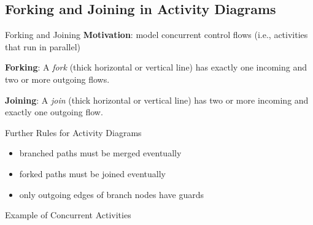 \subsection{Forking and Joining in Activity Diagrams}
\begin{frame}{\insertsubsection}
	\begin{fancycolumns}[animation=none]
		\nextcolumn
		\begin{definition}{{Forking and Joining \mysource{\umluserguide}}}
			\textbf{Motivation}: model concurrent control flows (i.e., activities that run in parallel)
			
			\textbf{Forking}: A \emph{fork} (thick horizontal or vertical line) has exactly one incoming and two or more outgoing flows. 
			
			\textbf{Joining}: A \emph{join} (thick horizontal or vertical line) has two or more incoming and exactly one outgoing flow. 
		\end{definition}
		\pause
		\begin{note}{Further Rules for Activity Diagrams}
			\begin{itemize}
				\item branched paths must be merged eventually 
				\item forked paths must be joined eventually
				\item only outgoing edges of branch nodes have guards
			\end{itemize}
		\end{note}
	\end{fancycolumns}
\end{frame}

	\begin{frame}{Example of Concurrent Activities}
	\end{frame}

